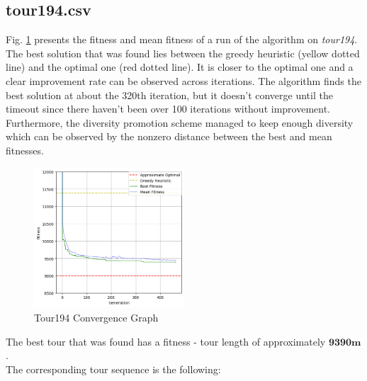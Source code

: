 \documentclass[a4paper,10pt]{article}
\newcommand{\ReplaceMe}[1]{{\color{blue}#1}}
\begin{document}
\subsection{tour194.csv} \label{ss:tour194}

%
%

Fig. \ref{fig:tour194convergence} presents the fitness and mean fitness of a run of the algorithm on \textit{tour194}. The best solution that was found lies between the greedy heuristic (yellow dotted line) and the optimal one (red dotted line). It is closer to the optimal one and a clear improvement rate can be observed across iterations. The algorithm finds the best solution at about the 320th iteration, but it doesn't converge until the timeout since there haven't been over 100 iterations without improvement. Furthermore, the diversity promotion scheme managed to keep enough diversity which can be observed by the nonzero distance between the best and mean fitnesses.

\begin{figure}[H]
    \centering
	\includegraphics[width=0.5\textwidth]{results/4.4/tour194_convergence.png}
    \caption{Tour194 Convergence Graph}
    \label{fig:tour194convergence}
\end{figure}

The best tour that was found has a fitness - tour length of approximately $\textbf{9390m}$.\\
The corresponding tour sequence is the following:
\end{document}
